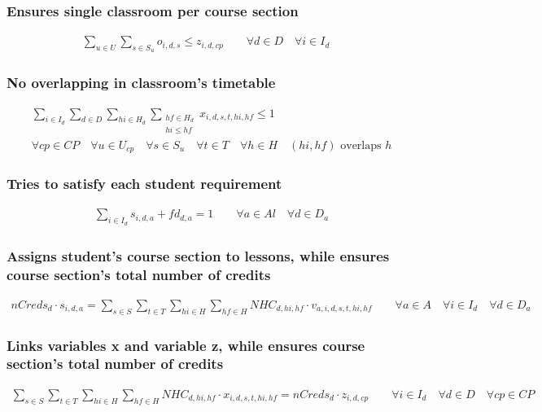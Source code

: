 \subsubsection{Ensures single classroom per course section}
\begin{eqnarray}
\sum\limits_{u \in U} \sum\limits_{s \in S_{u}} o_{i,d,s}  \leq  z_{i,d,cp}  \nonumber \qquad 
\forall d \in D \quad
\forall i \in I_{d} \quad
\end{eqnarray}

\subsubsection{No overlapping in classroom's timetable}
\begin{eqnarray}
\sum\limits_{i \in I_{d}} \sum\limits_{d \in D} \sum\limits_{hi \in H_{d}} \sum_{\substack {hf \in H_{d} \\ hi\le hf}} x_{i,d,s,t,hi,hf}  \leq  1  \nonumber \qquad 
\\
\forall cp \in CP \quad
\forall u \in U_{cp} \quad
\forall s \in S_{u} \quad
\forall t \in T \quad
\forall h \in H \quad (hi,hf)\text{ overlaps }h
\end{eqnarray}

\subsubsection{Tries to satisfy each student requirement}
\begin{eqnarray}
\sum\limits_{i \in I_{d}} s_{i,d,a} + fd_{d,a} = 1  \nonumber \qquad 
\forall a \in Al \quad
\forall d \in D_{a}
\end{eqnarray}

\subsubsection{Assigns student's course section to lessons, while ensures course section's total number of credits}
\begin{eqnarray}
nCreds_{d} \cdot s_{i,d,a} = \sum\limits_{s \in S}\sum\limits_{t \in T}\sum\limits_{hi \in H}\sum\limits_{hf \in H} NHC_{d,hi,hf} \cdot v_{a,i,d,s,t,hi,hf} \nonumber \qquad 
\forall a \in A \quad
\forall i \in I_{d} \quad
\forall d \in D_{a}
\end{eqnarray}

\subsubsection{Links variables x and variable z, while ensures course section's total number of credits}
\begin{eqnarray}
\sum\limits_{s \in S}\sum\limits_{t \in T}\sum\limits_{hi \in H}\sum\limits_{hf \in H} NHC_{d,hi,hf} \cdot x_{i,d,s,t,hi,hf} = nCreds_{d} \cdot z_{i,d,cp} \nonumber \qquad
\forall i \in I_{d} \quad
\forall d \in D \quad
\forall cp \in CP
\end{eqnarray}

